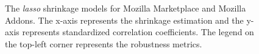 \begin{figure}[ht!] 
\centering     %
{}
  \captionsetup{justification=justified,
singlelinecheck=false}
\caption{The \textit{lasso} shrinkage models for Mozilla Marketplace and Mozilla Addons. The x-axis represents the shrinkage estimation and the y-axis represents standardized correlation coefficients. The legend on the top-left corner represents the robustness metrics. }
\label{fig:lasso2}
\end{figure} 

